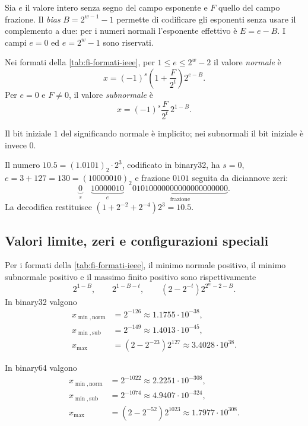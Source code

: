 Sia \(e\) il valore intero senza segno del campo esponente e \(F\)
quello del campo frazione. Il \emph{bias} \(B=2^{w-1}-1\) permette di
codificare gli esponenti senza usare il complemento a due: per i
numeri normali l'esponente effettivo è \(E=e-B\). I campi
\(e=0\) ed \(e=2^w-1\) sono riservati.

\begin{definition}
\label{def:fi-valori-ieee}
Nei formati della \cref{tab:fi-formati-ieee}, per
\(1\le e\le2^w-2\) il valore \emph{normale} è
\[
  x=(-1)^s\left(1+\frac{F}{2^t}\right)2^{e-B}.
\]
Per \(e=0\) e \(F\ne0\), il valore \emph{subnormale} è
\[
  x=(-1)^s\frac{F}{2^t}\,2^{1-B}.
\]
\end{definition}

Il bit iniziale \(1\) del significando normale è implicito;
nei subnormali il bit iniziale è invece \(0\).

\begin{example}
Il numero \(10.5=(1.0101)_2\cdot2^3\), codificato in binary32,
ha \(s=0\), \(e=3+127=130=(10000010)_2\) e frazione
\(0101\) seguita da diciannove zeri:
\[
  \underbrace{0}_{s}\quad
  \underbrace{10000010}_{e}\quad
  \underbrace{01010000000000000000000}_{\text{frazione}}.
\]
La decodifica restituisce \((1+2^{-2}+2^{-4})2^3=10.5\).
\end{example}

\clearpage

\subsection{Valori limite, zeri e configurazioni speciali}

Per i formati della \cref{tab:fi-formati-ieee}, il minimo normale
positivo, il minimo subnormale positivo e il massimo finito positivo
sono rispettivamente
\[
  2^{1-B},\qquad
  2^{1-B-t},\qquad
  (2-2^{-t})2^{2^w-2-B}.
\]
In binary32 valgono
\begin{align*}
  x_{\min,\mathrm{norm}}&=2^{-126}\approx1.1755\cdot10^{-38},\\
  x_{\min,\mathrm{sub}}&=2^{-149}\approx1.4013\cdot10^{-45},\\
  x_{\max}&=(2-2^{-23})2^{127}\approx3.4028\cdot10^{38}.
\end{align*}

In binary64 valgono
\begin{align*}
  x_{\min,\mathrm{norm}}&=2^{-1022}\approx2.2251\cdot10^{-308},\\
  x_{\min,\mathrm{sub}}&=2^{-1074}\approx4.9407\cdot10^{-324},\\
  x_{\max}&=(2-2^{-52})2^{1023}\approx1.7977\cdot10^{308}.
\end{align*}

